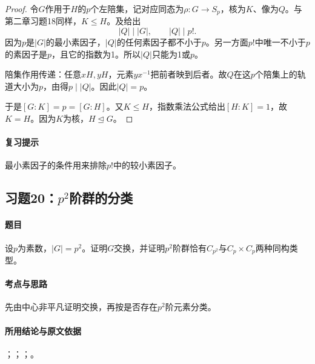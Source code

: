 \begin{proof}
令$G$作用于$H$的$p$个左陪集，记对应同态为$\rho:G\to S_p$，核为$K$、像为$Q$。与第二章习题18同样，$K\leq H$。及给出
\[
|Q|\mid|G|,\qquad |Q|\mid p!.
\]
因为$p$是$|G|$的最小素因子，$|Q|$的任何素因子都不小于$p$。另一方面$p!$中唯一不小于$p$的素因子是$p$，且它的指数为1。所以$|Q|$只能为1或$p$。

陪集作用传递：任意$xH,yH$，元素$yx^{-1}$把前者映到后者。故$Q$在这$p$个陪集上的轨道大小为$p$，由得$p\mid|Q|$。因此$|Q|=p$。

于是$[G:K]=p=[G:H]$。又$K\leq H$，指数乘法公式给出$[H:K]=1$，故$K=H$。因为$K$为核，$H\trianglelefteq G$。
\end{proof}

\paragraph{复习提示}
最小素因子的条件用来排除$p!$中的较小素因子。


\subsection{习题20：\texorpdfstring{$p^2$阶群的分类}{p2阶群的分类}}
\label{ex:2:20}

\paragraph{题目}
设$p$为素数，$|G|=p^2$。证明$G$交换，并证明$p^2$阶群恰有$C_{p^2}$与$C_p\times C_p$两种同构类型。

\paragraph{考点与思路}
先由中心非平凡证明交换，再按是否存在$p^2$阶元素分类。

\paragraph{所用结论与原文依据}
；；；。


